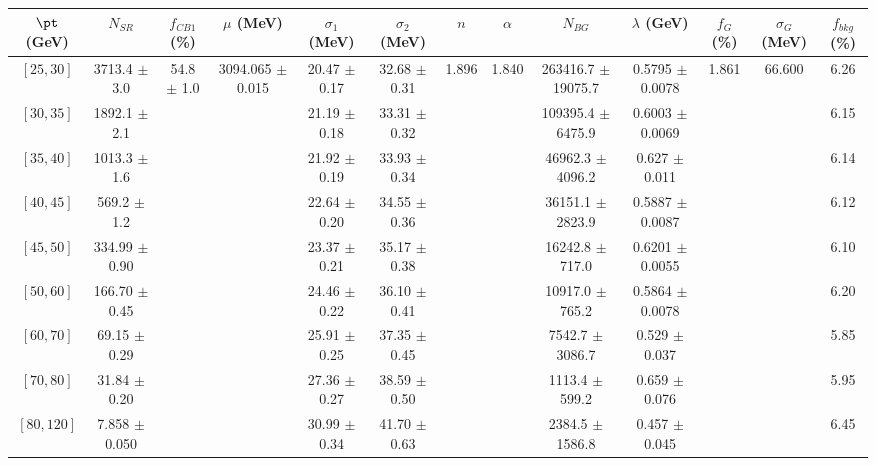 \begin{tabular}{c||c|c|c|c|c|c|c|c|c|c|c||c}
$\pt$ (GeV) & $N_{SR}$ & $f_{CB1}$ (\%) & $\mu$ (MeV) & $\sigma_1$ (MeV) & $\sigma_2$ (MeV) & $n$ & $\alpha$ & $N_{BG}$ & $\lambda$ (GeV) & $f_G$ (\%) & $\sigma_G$ (MeV) & $f_{bkg}$ (\%) \\
\hline
$[25, 30]$ & 3713.4 $\pm$ 3.0 & \multirow{9}{*}{54.8 $\pm$ 1.0} & \multirow{9}{*}{3094.065 $\pm$ 0.015} & 20.47 $\pm$ 0.17 & 32.68 $\pm$ 0.31 & \multirow{9}{*}{1.896} & \multirow{9}{*}{1.840} & 263416.7 $\pm$ 19075.7 & 0.5795 $\pm$ 0.0078 & \multirow{9}{*}{1.861} & \multirow{9}{*}{66.600} & 6.26\\
$[30, 35]$ & 1892.1 $\pm$ 2.1 &  &  & 21.19 $\pm$ 0.18 & 33.31 $\pm$ 0.32 &  &  & 109395.4 $\pm$ 6475.9 & 0.6003 $\pm$ 0.0069 &  &  & 6.15\\
$[35, 40]$ & 1013.3 $\pm$ 1.6 &  &  & 21.92 $\pm$ 0.19 & 33.93 $\pm$ 0.34 &  &  & 46962.3 $\pm$ 4096.2 & 0.627 $\pm$ 0.011 &  &  & 6.14\\
$[40, 45]$ & 569.2 $\pm$ 1.2 &  &  & 22.64 $\pm$ 0.20 & 34.55 $\pm$ 0.36 &  &  & 36151.1 $\pm$ 2823.9 & 0.5887 $\pm$ 0.0087 &  &  & 6.12\\
$[45, 50]$ & 334.99 $\pm$ 0.90 &  &  & 23.37 $\pm$ 0.21 & 35.17 $\pm$ 0.38 &  &  & 16242.8 $\pm$ 717.0 & 0.6201 $\pm$ 0.0055 &  &  & 6.10\\
$[50, 60]$ & 166.70 $\pm$ 0.45 &  &  & 24.46 $\pm$ 0.22 & 36.10 $\pm$ 0.41 &  &  & 10917.0 $\pm$ 765.2 & 0.5864 $\pm$ 0.0078 &  &  & 6.20\\
$[60, 70]$ & 69.15 $\pm$ 0.29 &  &  & 25.91 $\pm$ 0.25 & 37.35 $\pm$ 0.45 &  &  & 7542.7 $\pm$ 3086.7 & 0.529 $\pm$ 0.037 &  &  & 5.85\\
$[70, 80]$ & 31.84 $\pm$ 0.20 &  &  & 27.36 $\pm$ 0.27 & 38.59 $\pm$ 0.50 &  &  & 1113.4 $\pm$ 599.2 & 0.659 $\pm$ 0.076 &  &  & 5.95\\
$[80, 120]$ & 7.858 $\pm$ 0.050 &  &  & 30.99 $\pm$ 0.34 & 41.70 $\pm$ 0.63 &  &  & 2384.5 $\pm$ 1586.8 & 0.457 $\pm$ 0.045 &  &  & 6.45\\
\end{tabular}
